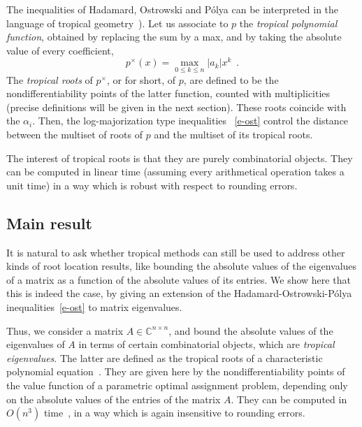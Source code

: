 \documentclass[a4paper]{amsart}
\theoremstyle{definition}
\theoremstyle{plain}
\theoremstyle{remark}
\begin{document}
The inequalities of Hadamard, Ostrowski and P\'olya can be interpreted in the language of tropical geometry~\cite{viro,itenberg,sturmfels2005}). Let us associate to $p$ the 
{\em tropical polynomial function}, obtained by replacing
the sum by a max, and by taking the absolute value of every coefficient,
\[ p^{\times}(x) = \max_{0 {\leqslant} k {\leqslant} n} |a_k| x^k \enspace .
\]
The {\em tropical roots} of $p^\times$, or for short, of $p$,
are defined to be
the nondifferentiability points of the latter function,
counted with multiplicities
(precise definitions will be given in the next section).
These roots coincide with the $\alpha_i$. Then,
the log-majorization type inequalities
~\eqref{e-ost} control the distance between the multiset of roots of $p$
and the multiset of its tropical roots. 

The interest of tropical roots 
is that they are purely combinatorial objects.
They can be computed in linear time (assuming every arithmetical
operation takes a unit time) in a way which
is robust with respect to rounding errors. 

\subsection{Main result}
It is natural to ask whether tropical methods can still
be used to address other kinds of root location results,
like bounding the absolute values of the eigenvalues
of a matrix as a function of the absolute values of its
entries. We show here that this is indeed the case,
by giving an extension of the Hadamard-Ostrowski-P\'olya inequalities~\eqref{e-ost} to matrix eigenvalues. 

Thus, we consider a matrix $A\in {\mathbb{C}}^{n\times n}$,
and bound the absolute values of the eigenvalues of $A$ in terms of certain
combinatorial objects, which are {\em tropical eigenvalues}. The
latter are defined as the tropical
roots of a characteristic polynomial equation~\cite{abg04,abg04b}. They are given here
by the nondifferentiability points of the value function of
a parametric optimal assignment problem, depending only on the absolute
values of the entries of the matrix $A$. They can be computed
in $O(n^3)$ time~\cite{gassner}, in a way which is again insensitive
to rounding errors. 
\end{document}
